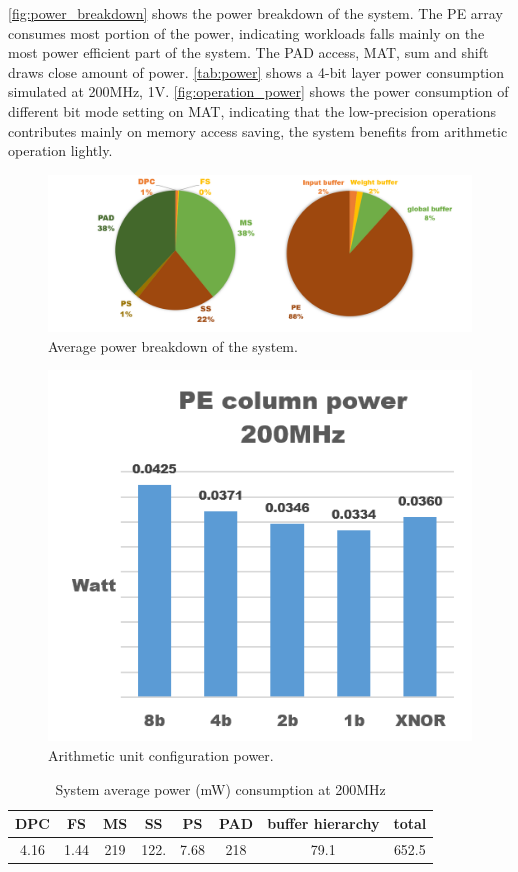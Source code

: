 \autoref{fig:power_breakdown} shows the power breakdown of the system. The PE array consumes most portion of the power, indicating workloads falls mainly on the most power efficient part of the system. The PAD access, MAT, sum and shift draws close amount of power. \autoref{tab:power} shows a 4-bit layer power consumption simulated at 200MHz, 1V. \autoref{fig:operation_power} shows the power consumption of different bit mode setting on MAT, indicating that the low-precision operations contributes mainly on memory access saving, the system benefits from arithmetic operation lightly.
\begin{figure}[h]
    \centering
    \includegraphics[width=1\linewidth]{inc/5_results/figure/power_breakdown.png}
    \caption{Average power breakdown of the system.}
    \label{fig:power_breakdown}
\end{figure}

\begin{figure}
    \centering
    \includegraphics[width=0.6\linewidth]{inc/5_results/figure/operation_power.png}
    \caption{Arithmetic unit configuration power.}
    \label{fig:operation_power}
\end{figure}
\begin{table}[h]
    \caption{System average power (mW) consumption at 200MHz}
    \label{tab:power}
    \centering
    \footnotesize 
        \begin{tabular}{cccccccc}
        DPC  & FS   & MS    & SS     & PS   & PAD     & buffer hierarchy & total   \\
        \toprule
        4.16 & 1.44 & 219 & 122. & 7.68 & 218 & 79.1           & 652.5\\
        \bottomrule
        \end{tabular}
\end{table}





